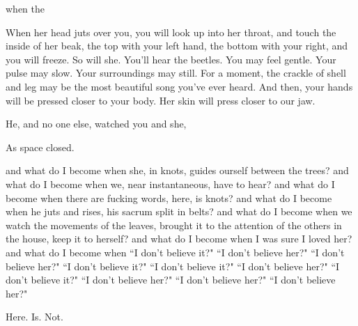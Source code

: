 \documentclass[11pt]{article}
\begin{document}
\begingroup
\begin{center}
when the
\rightskip\leftskip
\end{center}
\endgroup

\vspace*{2\baselineskip}

\begingroup
When her head juts over you, you will look up into her throat, and touch the inside of her beak, the top with your left hand, the bottom with your right, and you will freeze. So will she. You'll hear the beetles. You may feel gentle. Your pulse may slow. Your surroundings may still. For a moment, the crackle of shell and leg may be the most beautiful song you've ever heard. And then, your hands will be pressed closer to your body. Her skin will press closer to our jaw.
\endgroup

\vspace*{2\baselineskip}

\begingroup
\begin{center}
He, and no one else, watched you and she,
\end{center}
\endgroup

\begingroup
\begin{center}
As space closed.
\end{center}
\endgroup

\vspace*{2\baselineskip}

\begingroup
\begin{center}
and what do I become when she, in knots, guides ourself between the trees? and what do I become when we, near instantaneous, have to hear? and what do I become when there are fucking words, here, is knots? and what do I become when he juts and rises, his sacrum split in belts? and what do I become when we watch the movements of the leaves, brought it to the attention of the others in the house, keep it to herself? and what do I become when I was sure I loved her? and what do I become when ``I don't believe it?" ``I don't believe her?" ``I don't believe her?" ``I don't believe it?" ``I don't believe it?" ``I don't believe her?" ``I don't believe it?" ``I don't believe her?" ``I don't believe her?" ``I don't believe her?"
\end{center}
\endgroup

\vspace*{2\baselineskip}

\begingroup
\begin{center}
Here. Is. Not.
\rightskip\leftskip
\end{center}
\endgroup
\end{document}
